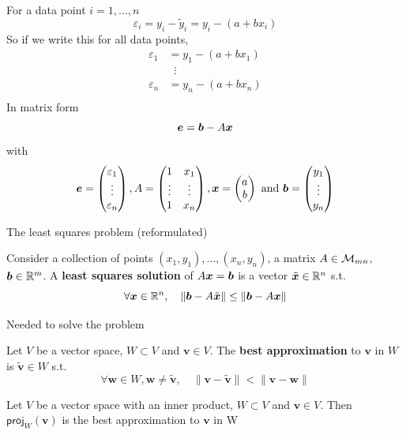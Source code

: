 \documentclass[aspectratio=169]{beamer}
\begin{document}
\begin{frame}
	For a data point $i=1,\ldots,n$
	\[
	\varepsilon_i = y_i-\tilde y_i = y_i - (a+bx_i)
	\]
	So if we write this for all data points,
	\begin{align*}
	\varepsilon_1 &= y_1 - (a+bx_1) \\
	&\;\;\vdots \\
	\varepsilon_n &= y_n - (a+bx_n) \\
	\end{align*}
	In matrix form
	\[
	\bm{e} = \bm{b}-A\bm{x}
	\]
	with
	\[
	\bm{e} = \begin{pmatrix}
	\varepsilon_1\\ \vdots\\ \varepsilon_n
	\end{pmatrix},
	A=\begin{pmatrix}
	1 & x_1 \\ \vdots & \vdots \\ 1 & x_n
	\end{pmatrix},
	\bm{x} = \begin{pmatrix}
	a\\b
	\end{pmatrix}\textrm{ and }
	\bm{b} = \begin{pmatrix}
	y_1\\ \vdots\\ y_n
	\end{pmatrix}
	\]
\end{frame}

\begin{frame}{The least squares problem (reformulated)}
\begin{definition}
Consider a collection of points $(x_1,y_1),\ldots,(x_n,y_n)$, a matrix $A\in\mathcal{M}_{mn}$, $\bm{b}\in\mathbb{R}^m$. A \textbf{least squares solution} of $A\bm{x}=\bm{b}$ is a vector $\tilde {\bm{x}}\in\mathbb{R}^n$ s.t.
\[
\forall \bm{x}\in\mathbb{R}^n,\quad \|\bm{b}-A\tilde{\bm{x}}\|\leq \|\bm{b}-A\bm{x}\|
\]
\end{definition}
\end{frame}


\begin{frame}{Needed to solve the problem}
\begin{definition}
Let $V$ be a vector space, $W\subset V$ and $\mathbf{v}\in V$. The \textbf{best approximation} to $\mathbf{v}$ in $W$ is $\tilde{\mathbf{v}}\in W$ s.t.
\[
\forall\mathbf{w}\in W, \mathbf{w}\neq\tilde{\mathbf{v}}, \quad
\|\mathbf{v}-\tilde{\mathbf{v}}\| < \|\mathbf{v}-\mathbf{w}\|
\]
\end{definition}
\vfill
\begin{theorem}
Let $V$ be a vector space with an inner product, $W\subset V$ and $\mathbf{v}\in V$. Then $\mathsf{proj}_W(\mathbf{v})$ is the best approximation to $\mathbf{v}$ in W
\end{theorem}
\end{frame}
\end{document}
